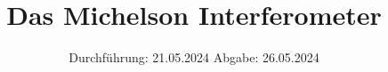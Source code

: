 

\subject{v401}
\title{Das Michelson Interferometer}
\date{%
  Durchführung: 21.05.2024
  \hspace{3em}
  Abgabe: 26.05.2024
}



\maketitle
\thispagestyle{empty}
\tableofcontents
\newpage






\printbibliography{}

